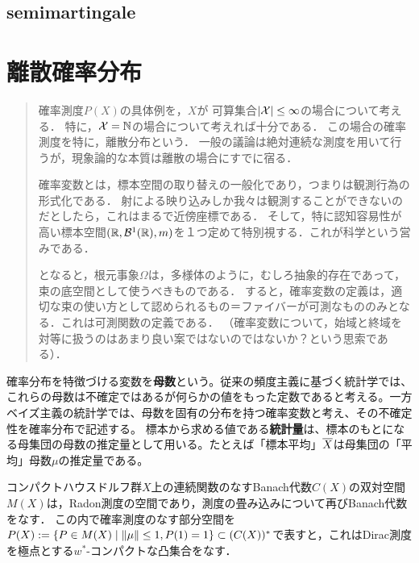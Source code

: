 \documentclass[uplatex,dvipdfmx]{jsreport}
\begin{document}
\section{semimartingale}







\chapter{離散確率分布}

\begin{quotation}
    確率測度$P(X)$の具体例を，$X$が
    可算集合$\lvert\mathcal{X}\rvert\le\infty$の場合について考える．
    特に，$\mathcal{X}=\mathbb{N}$の場合について考えれば十分である．
    この場合の確率測度を特に，離散分布という．
    一般の議論は絶対連続な測度を用いて行うが，現象論的な本質は離散の場合にすでに宿る．

    確率変数とは，標本空間の取り替えの一般化であり，つまりは観測行為の形式化である．
    射による映り込みしか我々は観測することができないのだとしたら，これはまるで近傍座標である．
    そして，特に認知容易性が高い標本空間$(\mathbb{R},\mathcal{B}^1(\mathbb{R}),m)$を１つ定めて特別視する．これが科学という営みである．
    
    となると，根元事象$\Omega$は，多様体のように，むしろ抽象的存在であって，束の底空間として使うべきものである．
    すると，確率変数の定義は，適切な束の使い方として認められるもの＝ファイバーが可測なもののみとなる．これは可測関数の定義である．
    （確率変数について，始域と終域を対等に扱うのはあまり良い案ではないのではないか？という思索である）．
\end{quotation}

\begin{remark*}[statistics]
    確率分布を特徴づける変数を\textbf{母数}という。従来の頻度主義に基づく統計学では、これらの母数は不確定ではあるが何らかの値をもった定数であると考える。一方ベイズ主義の統計学では、母数を固有の分布を持つ確率変数と考え、その不確定性を確率分布で記述する。 
    標本から求める値である\textbf{統計量}は、標本のもとになる母集団の母数の推定量として用いる。たとえば「標本平均」$\overline{X}$は母集団の「平均」母数$\mu$の推定量である。
\end{remark*}

\begin{notation}
    コンパクトハウスドルフ群$X$上の連続関数のなすBanach代数$C(X)$の双対空間$M(X)$は，Radon測度の空間であり，測度の畳み込みについて再びBanach代数をなす．
    この内で確率測度のなす部分空間を$P(X):=\left\{P\in M(X)\mid \|\mu\|\le 1,P(1)=1\right\}\subset(C(X))^*$で表すと，これはDirac測度を極点とする$w^*$-コンパクトな凸集合をなす．
\end{notation}
\end{document}
